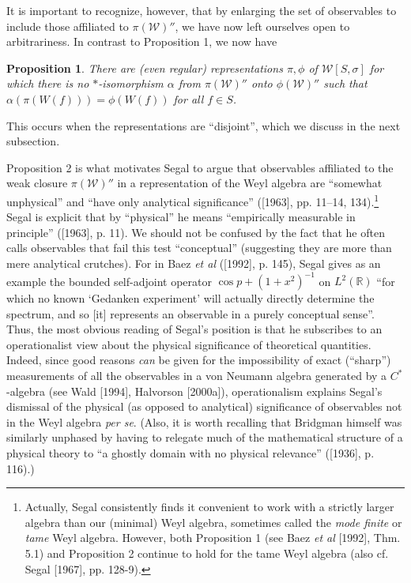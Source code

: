 \documentclass[12pt]{article}
\newtheorem{prop}{Proposition}
\theoremstyle{remark}
\theoremstyle{definition}
\newcommand{\alg}[1]{\mathcal{#1}}
\begin{document}
It is important to recognize, however, that by enlarging the set of
observables to include those affiliated to $\pi(\alg{W})''$, we have
now left ourselves open to arbitrariness. In contrast to Proposition
1, we now have
\begin{prop} There are (even regular) representations $\pi ,\phi$ 
of $\alg{W}[S,\sigma]$ for which there \emph{is no} $*$-isomorphism 
$\alpha$ from $\pi(\alg{W})''$ onto
  $\phi(\alg{W})''$ such that $\alpha (\pi(W(f)))=\phi(W(f))$ for all
  $f\in S$. \end{prop}
  \noindent This occurs when the representations are ``disjoint'', 
  which we discuss in the next subsection. 
  
  Proposition 2 is what motivates Segal to argue that observables
  affiliated to the weak closure $\pi(\alg{W})''$ in a representation
  of the Weyl algebra are ``somewhat unphysical'' and ``have only
  analytical significance'' ([1963], pp. 11--14,
  134).\footnote{Actually, Segal consistently finds it convenient to
    work with a strictly larger algebra than our (minimal) Weyl
    algebra, sometimes called the \emph{mode finite} or \emph{tame}
    Weyl algebra. However, both Proposition 1 (see Baez \emph{et al}
    [1992], Thm. 5.1) and Proposition 2 continue to hold for the tame
    Weyl algebra (also cf.  Segal [1967], pp. 128-9).}  Segal is
  explicit that by ``physical'' he means ``empirically measurable in
  principle'' ([1963], p.  11). We should not be confused by the fact
  that he often calls observables that fail this test ``conceptual''
  (suggesting they are more than mere analytical crutches).  For in
  Baez \emph{et al} ([1992], p. 145), Segal gives as an example the
  bounded self-adjoint operator $\cos p +(1+x^{2})^{-1}$ on
  $L^{2}(\mathbb{R})$ ``for which no known `Gedanken experiment' will
  actually directly determine the spectrum, and so [it] represents an
  observable in a purely conceptual sense''.  Thus, the most obvious
  reading of Segal's position is that he subscribes to an
  operationalist view about the physical significance of theoretical
  quantities.  Indeed, since good reasons \emph{can} be given for the
  impossibility of exact (``sharp'') measurements of all the
  observables in a von Neumann algebra generated by a $C^{*}$-algebra
  (see Wald [1994], Halvorson [2000a]), operationalism explains
  Segal's dismissal of the physical (as opposed to analytical)
  significance of observables not in the Weyl algebra \emph{per se}.
  (Also, it is worth recalling that Bridgman himself was similarly
  unphased by having to relegate much of the mathematical structure of
  a physical theory to ``a ghostly domain with no physical relevance''
  ([1936], p. 116).)
  
\end{document}
